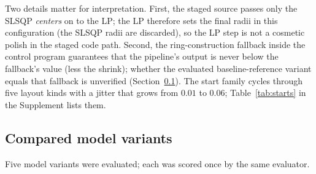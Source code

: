 \documentclass{article} %
\begin{document}
Two details matter for interpretation. First, the staged source passes only the SLSQP \emph{centers} on to the LP; the LP therefore sets the final radii in this configuration (the SLSQP radii are discarded), so the LP step is not a cosmetic polish in the staged code path. Second, the ring-construction fallback inside the control program guarantees that the pipeline's output is never below the fallback's value (less the shrink); whether the evaluated baseline-reference variant equals that fallback is unverified (Section~\ref{sec:variants}). The start family cycles through five layout kinds with a jitter that grows from $0.01$ to $0.06$; Table~\ref{tab:starts} in the Supplement lists them.

\subsection{Compared model variants}\label{sec:variants}
Five model variants were evaluated; each was scored once by the same evaluator.
\end{document}
